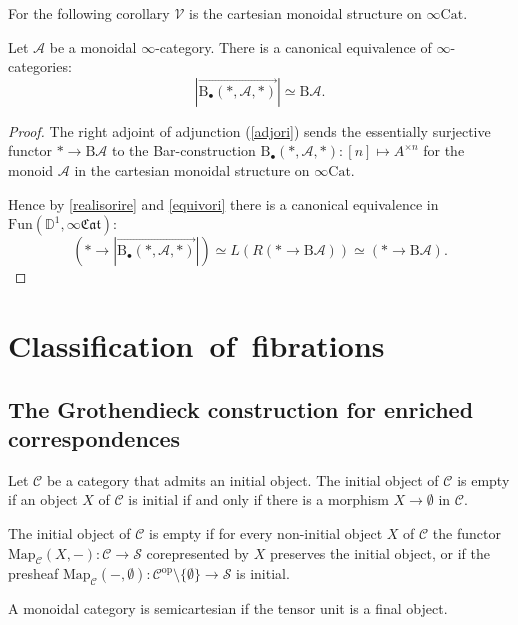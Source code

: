 \documentclass[10pt,oneside]{article}
\numberwithin{equation}{section} %
\numberwithin{figure}{section} %
\theoremstyle{plain}
\theoremstyle{definition}
\newcommand{\bD}{{\mathbb D}}
\newcommand{\mA}{{\mathcal A}}
\newcommand{\mC}{{\mathcal C}}
\newcommand{\mS}{{\mathcal S}}
\newcommand{\mV}{{\mathcal V}}
\newcommand{\B}{\mathrm{B}}
\newcommand{\op}{\mathrm{op}}
\newcommand{\Cat}{\mathrm{Cat}}
\newcommand{\Fun}{\mathrm{Fun}}
\newcommand{\Map}{{\mathrm{Map}}}
\newcommand{\fcat}{\mathfrak{Cat}}
\begin{document}
For the following corollary $\mV$ is the cartesian monoidal structure on
$\infty\Cat.$

\begin{corollary}

Let $\mA$ be a monoidal $\infty$-category.
There is a canonical equivalence of $\infty$-categories:
$$|\overset{\to}{\B_\bullet(*,\mA,*)}| \simeq \B\mA.$$

\end{corollary}

\begin{proof}

The right adjoint of adjunction (\ref{adjori}) sends
the essentially surjective functor $* \to \B\mA$ to the Bar-construction 
$\B_\bullet(*,\mA,*): [n] \mapsto A^{\times n}$ for the monoid $\mA$ in the cartesian monoidal structure on $\infty\Cat.$

Hence by \cref{realisorire} and \cref{equivori} there is a canonical equivalence in $\Fun(\bD^1, \infty\fcat): $
$$ (* \to |\overset{\to}{\B_\bullet(*,\mA,*)}|) \simeq L(R(* \to \B\mA)) \simeq (* \to \B\mA).$$
\end{proof}

\section{\mbox{Classification of fibrations}}

\subsection{The Grothendieck construction for enriched correspondences}

\begin{definition}
Let $\mC$ be a category that admits an initial object.    
The initial object of $\mC$ is empty if an object $X$ of $\mC$ is initial if and only if there is a morphism $X \to \emptyset$ in $\mC.$

\end{definition}

\begin{remark}
The initial object of $\mC$ is empty if for every non-initial object $X$ of $\mC$ the functor
$\Map_\mC(X,-): \mC \to \mS$ corepresented by $X$ preserves the initial object, or if the presheaf $ \Map_\mC(-,\emptyset): \mC^\op \setminus \{\emptyset\} \to \mS$ is initial.
    
\end{remark}

\begin{definition}
A monoidal category is semicartesian if the tensor unit is a final object.
    
\end{definition}
\end{document}
